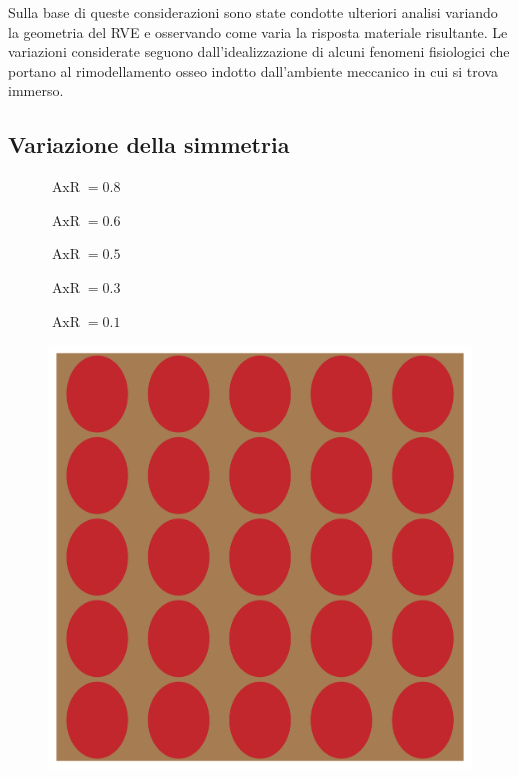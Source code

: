 \documentclass[a4paper,num-refs]{oup-contemporary}
\begin{document}
Sulla base di queste considerazioni sono state condotte ulteriori analisi variando la geometria del RVE e osservando come varia la risposta materiale risultante. Le variazioni considerate seguono dall'idealizzazione di alcuni fenomeni fisiologici che portano al rimodellamento osseo indotto dall'ambiente meccanico in cui si trova immerso.



\subsection{Variazione della simmetria}

\begin{figure} 
	\centering
	\begin{minipage}[b]{0.19\linewidth}
		\centering
		$\operatorname{AxR}=0.8	$
	\end{minipage}
	\begin{minipage}[b]{0.19\linewidth}
		\centering
		$\operatorname{AxR}=0.6	$
	\end{minipage}
	\begin{minipage}[b]{0.19\linewidth}
		\centering
		$	\operatorname{AxR}=0.5$
	\end{minipage}
	\begin{minipage}[b]{0.19\linewidth}
		\centering
		$	\operatorname{AxR}=0.3$
	\end{minipage}
	\begin{minipage}[b]{0.19\linewidth}
		\centering
		$	\operatorname{AxR}=0.1$
	\end{minipage} 
	\begin{minipage}[b]{0.19\linewidth}
		\includegraphics[width=\linewidth]{test_mesh_axR_0.8.png}

\end{minipage}
\end{figure}
\end{document}

